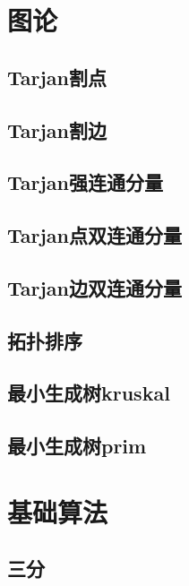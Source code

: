 \documentclass{article}
\begin{document}
\begin{multicols*}{2}

\thispagestyle{empty}
\tableofcontents
\newpage
\setcounter{page}{1}
\section{图论}
\subsection{Tarjan割点}

\subsection{Tarjan割边}

\subsection{Tarjan强连通分量}

\subsection{Tarjan点双连通分量}

\subsection{Tarjan边双连通分量}

\subsection{拓扑排序}

\subsection{最小生成树kruskal}

\subsection{最小生成树prim}

\section{基础算法}
\subsection{三分}


\end{multicols*}
\end{document}
